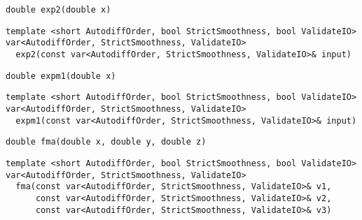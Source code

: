 \begin{tcolorbox}[colback=white,colframe=gray90, coltitle=black,boxrule=3pt,
fonttitle=\bfseries,title= Exp2]

\begin{verbatim}
double exp2(double x)

\end{verbatim}

\begin{verbatim}
template <short AutodiffOrder, bool StrictSmoothness, bool ValidateIO>
var<AutodiffOrder, StrictSmoothness, ValidateIO>
  exp2(const var<AutodiffOrder, StrictSmoothness, ValidateIO>& input)

\end{verbatim}

\end{tcolorbox}

\begin{tcolorbox}[colback=white,colframe=gray90, coltitle=black,boxrule=3pt,
fonttitle=\bfseries,title= Expm1]

\begin{verbatim}
double expm1(double x)

\end{verbatim}

\begin{verbatim}
template <short AutodiffOrder, bool StrictSmoothness, bool ValidateIO>
var<AutodiffOrder, StrictSmoothness, ValidateIO>
  expm1(const var<AutodiffOrder, StrictSmoothness, ValidateIO>& input)

\end{verbatim}

\end{tcolorbox}

\begin{tcolorbox}[colback=white,colframe=gray90, coltitle=black,boxrule=3pt,
fonttitle=\bfseries,title= Fma]

\begin{verbatim}
double fma(double x, double y, double z)

\end{verbatim}

\begin{verbatim}
template <short AutodiffOrder, bool StrictSmoothness, bool ValidateIO>
var<AutodiffOrder, StrictSmoothness, ValidateIO>
  fma(const var<AutodiffOrder, StrictSmoothness, ValidateIO>& v1,
      const var<AutodiffOrder, StrictSmoothness, ValidateIO>& v2,
      const var<AutodiffOrder, StrictSmoothness, ValidateIO>& v3)

\end{verbatim}

\end{tcolorbox}


